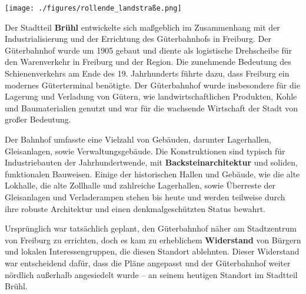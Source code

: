 \documentclass[landscape, a4paper]{article}
\newcommand\alert[1]{\textcolor{PrimaryColor}{\textbf{#1}}}
\begin{document}
\hspace{0.4cm}
\begin{minipage}[t]{0.32\textwidth}
	\vspace{0cm}
	\setlength{\parskip}{0.25cm}

	\texttt{[image: ./figures/rollende\_landstraße.png]}
	\setlength{\parskip}{0.25cm}

	Der Stadtteil \alert{Brühl} entwickelte sich maßgeblich im Zusammenhang mit der Industrialisierung und der Errichtung des Güterbahnhofs in Freiburg. Der Güterbahnhof wurde um 1905 gebaut und diente als logistische Drehscheibe für den Warenverkehr in Freiburg und der Region. Die zunehmende Bedeutung des Schienenverkehrs am Ende des 19. Jahrhunderts führte dazu, dass Freiburg ein modernes Güterterminal benötigte.
	Der Güterbahnhof wurde insbesondere für die Lagerung und Verladung von Gütern, wie landwirtschaftlichen Produkten, Kohle und Baumaterialien genutzt und war für die wachsende Wirtschaft der Stadt von großer Bedeutung.

	Der Bahnhof umfasste eine Vielzahl von Gebäuden, darunter Lagerhallen, Gleisanlagen, sowie Verwaltungsgebäude. Die Konstruktionen sind typisch für Industriebauten der Jahrhundertwende, mit \alert{Backsteinarchitektur} und soliden, funktionalen Bauweisen. Einige der historischen Hallen und Gebäude, wie die alte Lokhalle, die alte Zollhalle und zahlreiche Lagerhallen, sowie Überreste der Gleisanlagen und Verladerampen stehen bis heute und werden teilweise durch ihre robuste Architektur und einen denkmalgeschützten Status bewahrt.

	Ursprünglich war tatsächlich geplant, den Güterbahnhof näher am Stadtzentrum von Freiburg zu errichten, doch es kam zu erheblichem \alert{Widerstand} von Bürgern und lokalen Interessengruppen, die diesen Standort ablehnten. Dieser Widerstand war entscheidend dafür, dass die Pläne angepasst und der Güterbahnhof weiter nördlich außerhalb angesiedelt wurde – an seinem heutigen Standort im Stadtteil Brühl.


\end{minipage}
\end{document}
